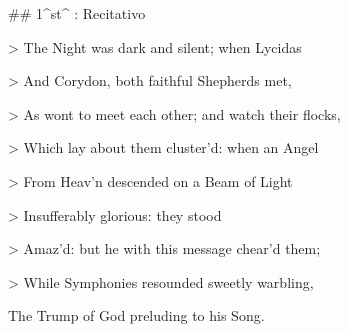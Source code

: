 ## 1^st^ \mvmt: Recitativo

\beginnumbering
\pstart
> The Night was dark and silent; when Lycidas 

> And Corydon, both faithful Shepherds met, 

> As wont to meet each other; and watch their flocks, 

> Which lay about them cluster’d: when an Angel 

> From Heav’n descended on a Beam of Light 

> Insufferably glorious: they stood 

> Amaz’d: but he with this message chear’d them; 

> While Symphonies resounded sweetly warbling, 

The Trump of God preluding to his Song.
\pend
\endnumbering
